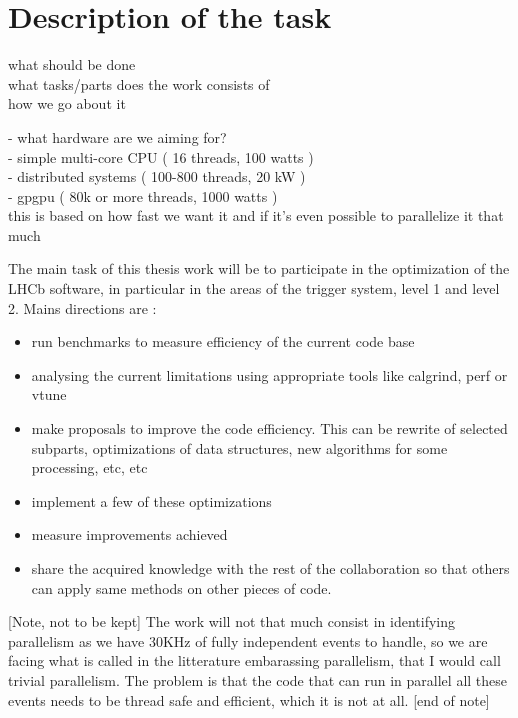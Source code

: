 \documentclass[12pt]{article}
\newcommand\tab[1][.7cm]{\hspace*{#1}}
\begin{document}
	\section{Description of the task}
	
	\color{red}
	what should be done \\
	what tasks/parts does the work consists of \\
	how we go about it
	\color{black}
	\vspace{1pc}
	
	
	\color{blue}
	- what hardware are we aiming for? \\
	\tab - simple multi-core CPU ( 16 threads, 100 watts ) \\
	\tab - distributed systems ( 100-800 threads, 20 kW ) \\
	\tab - gpgpu ( 80k or more threads, 1000 watts ) \\
	this is based on how fast we want it and if it's even possible to parallelize it that much

        The main task of this thesis work will be to participate in the optimization of the LHCb software, in particular in the areas of the trigger system, level 1 and level 2. Mains directions are :
        \begin{itemize}
        \item run benchmarks to measure efficiency of the current code base
        \item analysing the current limitations using appropriate tools like calgrind, perf or vtune
        \item make proposals to improve the code efficiency. This can be rewrite of selected subparts, optimizations of data structures, new algorithms for some processing, etc, etc
        \item implement a few of these optimizations
        \item measure improvements achieved
        \item share the acquired knowledge with the rest of the collaboration so that others can apply same methods on other pieces of code.
        \end{itemize}
	\color{black}
	\vspace{1pc}

        [Note, not to be kept] The work will not that much consist in identifying parallelism as we have 30KHz of fully independent events to handle, so we are facing what is called in the litterature embarassing parallelism, that I would call trivial parallelism. The problem is that the code that can run in parallel all these events needs to be thread safe and efficient, which it is not at all.
        [end of note]
\end{document}
